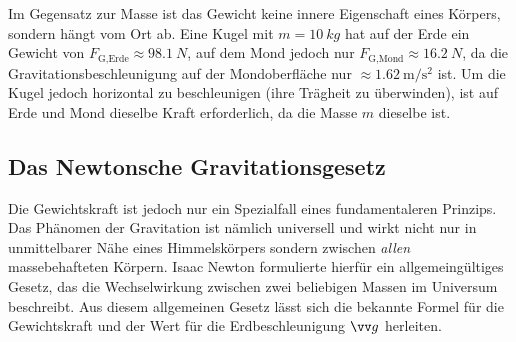 Im Gegensatz zur Masse ist das Gewicht keine innere Eigenschaft eines Körpers, sondern hängt vom Ort ab. Eine Kugel mit $m = \SI{10}{kg}$ hat auf der Erde ein Gewicht von $F_{\text{G},\text{Erde}} \approx \SI{98.1}{N}$, auf dem Mond jedoch nur $F_{\text{G},\text{Mond}} \approx \SI{16.2}{N}$, da die Gravitationsbeschleunigung auf der Mondoberfläche nur $\approx \SI{1.62}{\meter\per\second\squared}$ ist. Um die Kugel jedoch horizontal zu beschleunigen (ihre Trägheit zu überwinden), ist auf Erde und Mond dieselbe Kraft erforderlich, da die Masse $m$ dieselbe ist.


\subsection{Das Newtonsche Gravitationsgesetz}
Die Gewichtskraft ist jedoch nur ein Spezialfall eines fundamentaleren Prinzips. Das Phänomen der Gravitation ist nämlich universell und wirkt nicht nur in unmittelbarer Nähe eines Himmelskörpers sondern zwischen \textit{allen} massebehafteten Körpern. Isaac Newton formulierte hierfür ein allgemeingültiges Gesetz, das die Wechselwirkung zwischen zwei beliebigen Massen im Universum beschreibt. Aus diesem allgemeinen Gesetz lässt sich die bekannte Formel für die Gewichtskraft und der Wert für die Erdbeschleunigung $\ivec{g}$ herleiten.

